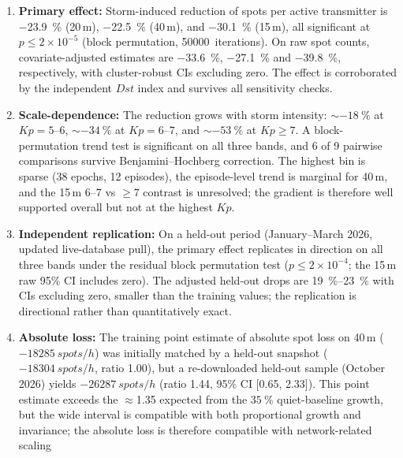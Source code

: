 \documentclass{agujournal2019}
\begin{document}
{\sloppy
\begin{enumerate}
	\item \textbf{Primary effect:} Storm-induced reduction of spots per active transmitter is
	      \SI{-23.9}{\percent} (20\,m), \SI{-22.5}{\percent} (40\,m), and
	      \SI{-30.1}{\percent} (15\,m), all significant at
	      $p \le 2 \times 10^{-5}$ (block permutation,
	      \SI{50000}{iterations}). On raw spot counts, covariate-adjusted
	      estimates are \SI{-33.6}{\percent}, \SI{-27.1}{\percent} and
	      \SI{-39.8}{\percent}, respectively, with cluster-robust CIs
	      excluding zero. The effect is corroborated by the independent $Dst$
	      index and survives all sensitivity checks.
	\item \textbf{Scale-dependence:} The reduction grows with storm
	      intensity: $\sim\SI{-18}{\percent}$ at $Kp = 5\text{--}6$,
	      $\sim\SI{-34}{\percent}$ at $Kp = 6\text{--}7$, and
	      $\sim\SI{-53}{\percent}$ at $Kp \ge 7$. A block-permutation trend
	      test is significant on all three bands, and 6 of 9 pairwise
	      comparisons survive Benjamini--Hochberg correction. The highest
	      bin is sparse (38 epochs, 12 episodes), the episode-level trend is
	      marginal for 40\,m, and the 15\,m $6\text{--}7$ vs $\ge 7$
	      contrast is unresolved; the gradient is therefore well supported
	      overall but not at the highest $Kp$.
	\item \textbf{Independent replication:} On a held-out period
	      (January--March 2026, updated live-database pull), the primary
	      effect replicates in direction on all three bands under the residual block
	      permutation test ($p \le 2 \times 10^{-4}$; the 15\,m raw 95\% CI
	      includes zero). The adjusted held-out drops are
	      \SIrange{19}{23}{\percent} with CIs excluding zero, smaller than
	      the training values; the replication is directional rather than
	      quantitatively exact.
	\item \textbf{Absolute loss:} The training point estimate of absolute
	      spot loss on 40\,m ($\SI{-18285}{spots/h}$) was initially matched
	      by a held-out snapshot ($\SI{-18304}{spots/h}$, ratio 1.00), but a
	      re-downloaded held-out sample (October 2026) yields
	      $\SI{-26287}{spots/h}$ (ratio 1.44, 95\% CI [0.65, 2.33]). This
	      point estimate exceeds the $\approx$1.35 expected from the
	      $\SI{+35}{\percent}$ quiet-baseline growth, but the wide interval
	      is compatible with both proportional growth and invariance; the
	      absolute loss is therefore compatible with network-related scaling

\end{enumerate}}
\end{document}
